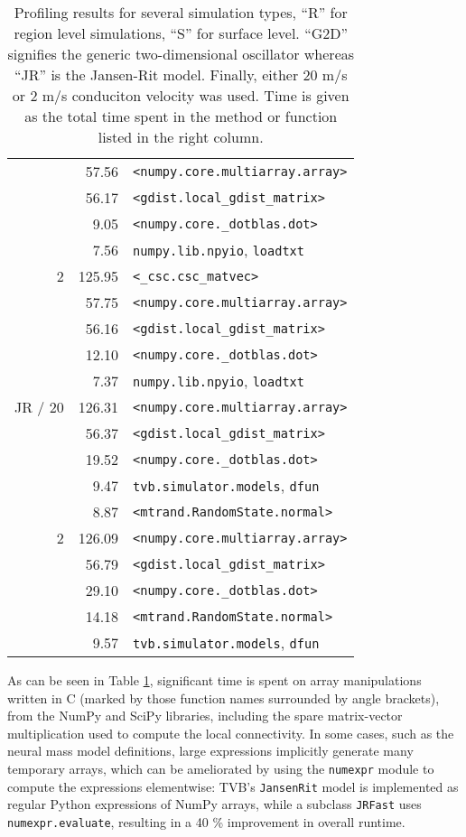 \documentclass{bioinfo}
\begin{document}
\begin{table}
{\begin{tabular}{r | r | l }
	&         57.56& \texttt{<numpy.core.multiarray.array>} \\
	 &         56.17& \texttt{<gdist.local\_gdist\_matrix>} \\
	 &           9.05& \texttt{<numpy.core.\_dotblas.dot>} \\
	 &         7.56& \texttt{numpy.lib.npyio}, \texttt{loadtxt} \\
	\hline
	2 &         125.95& \texttt{<\_csc.csc\_matvec>} \\
	&         57.75& \texttt{<numpy.core.multiarray.array>} \\
	 &         56.16& \texttt{<gdist.local\_gdist\_matrix>} \\
	 &         12.10& \texttt{<numpy.core.\_dotblas.dot>} \\
	 &         7.37& \texttt{numpy.lib.npyio}, \texttt{loadtxt} \\
	\hline
	JR / 20 &         126.31& \texttt{<numpy.core.multiarray.array>} \\
	&         56.37& \texttt{<gdist.local\_gdist\_matrix>} \\
	 &         19.52& \texttt{<numpy.core.\_dotblas.dot>} \\
	 &         9.47& \texttt{tvb.simulator.models}, \texttt{dfun} \\
	 &         8.87& \texttt{<mtrand.RandomState.normal>} \\
	\hline
	2 &         126.09& \texttt{<numpy.core.multiarray.array>} \\
	&         56.79& \texttt{<gdist.local\_gdist\_matrix>} \\
	 &          29.10& \texttt{<numpy.core.\_dotblas.dot>} \\
	 &         14.18& \texttt{<mtrand.RandomState.normal>} \\
	 &         9.57& \texttt{tvb.simulator.models}, \texttt{dfun} \\
	\hline

	\end{tabular}}
	\caption{Profiling results for several simulation types, ``R'' for region 
	level simulations, ``S'' for surface level. ``G2D'' signifies the generic
	two-dimensional oscillator whereas ``JR'' is the Jansen-Rit model. Finally,
	either 20 m/s or 2 m/s conduciton velocity was used. Time is given as the
	total time spent in the method or function listed in the right column.}
	\label{tab:profiling}
	\end{table}


As can be seen in Table \ref{tab:profiling},
significant time is spent on array manipulations written in C (marked by those
function names surrounded by angle brackets), from the NumPy and SciPy libraries, 
including the spare matrix-vector multiplication used to compute the local connectivity.
In some cases, such as the 
neural mass model definitions, large expressions implicitly generate many 
temporary arrays, which can be ameliorated by using the \texttt{numexpr} module
to compute the expressions elementwise: TVB's \texttt{JansenRit} model is
implemented as regular Python expressions of NumPy arrays, while a subclass
\texttt{JRFast} uses \texttt{numexpr.evaluate}, resulting in a 40 \% improvement
in overall runtime.
\end{document}
